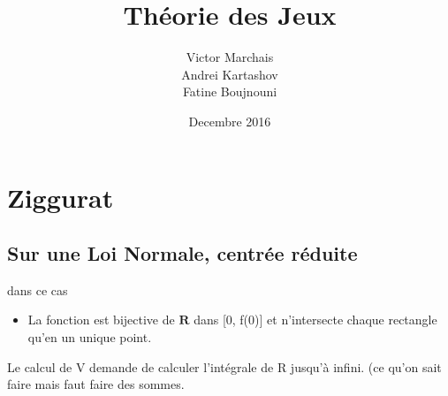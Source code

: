 \documentclass{article}
\title{Théorie des Jeux}
\author{Victor Marchais \\ Andrei Kartashov \\ Fatine Boujnouni}
\date{Decembre 2016}
\begin{document}
\section{Ziggurat}
\subsection*{Sur une Loi Normale, centrée réduite}
dans ce cas 
\begin{itemize}
\item La fonction est bijective de $\mathbf{R}$ dans [0, f(0)] et n'intersecte chaque rectangle qu'en un unique point.
\end{itemize}

Le calcul de V demande de calculer l'intégrale de R jusqu'à infini. (ce qu'on sait faire mais faut faire des sommes.
\end{document}
